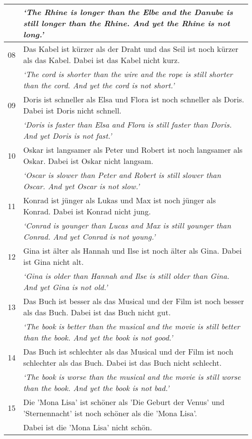 \documentclass[output=paper,
modfonts
]{langscibook}
\begin{document}
\begin{table}[H]
\begin{tabular}{l|l}
   & \textit{`The Rhine is longer than the Elbe and the Danube is still longer than the Rhine. And yet the Rhine is not long.'}\\
\midrule
08 & Das Kabel ist kürzer als der Draht und das Seil ist noch kürzer als das Kabel. Dabei ist das Kabel nicht kurz.\\
   & \textit{`The cord is shorter than the wire and the rope is still shorter than the cord. And yet the cord is not short.'}\\
\midrule
09 & Doris ist schneller als Elsa und Flora ist noch schneller als Doris. Dabei ist Doris nicht schnell.\\
   & \textit{`Doris is faster than Elsa and Flora is still faster than Doris. And yet Doris is not fast.'}\\
\midrule
10 & Oskar ist langsamer als Peter und Robert ist noch langsamer als Oskar. Dabei ist Oskar nicht langsam.\\
   & \textit{`Oscar is slower than Peter and Robert is still slower than Oscar. And yet Oscar is not slow.'}\\
\midrule
11 & Konrad ist jünger als Lukas und Max ist noch jünger als Konrad. Dabei ist Konrad nicht jung.\\
   & \textit{`Conrad is younger than Lucas and Max is still younger than Conrad. And yet Conrad is not young.'}\\
\midrule
12 & Gina ist älter als Hannah und Ilse ist noch älter als Gina. Dabei ist Gina nicht alt.\\
   & \textit{`Gina is older than Hannah and Ilse is still older than Gina. And yet Gina is not old.'} \\
\midrule
13 & Das Buch ist besser als das Musical und der Film ist noch besser als das Buch. Dabei ist das Buch nicht gut.\\
   & \textit{`The book is better than the musical and the movie is still better than the book. And yet the book is not good.'} \\
\midrule
14 & Das Buch ist schlechter als das Musical und der Film ist noch schlechter als das Buch. Dabei ist das Buch nicht schlecht.\\
   & \textit{`The book is worse than the musical and the movie is still worse than the book. And yet the book is not bad.'} \\
\midrule
15 & Die 'Mona Lisa' ist schöner als 'Die Geburt der Venus' und 'Sternennacht' ist noch schöner als die 'Mona Lisa'. \\
   & Dabei ist die 'Mona Lisa' nicht schön. \\

\end{tabular}
\end{table}
\end{document}
